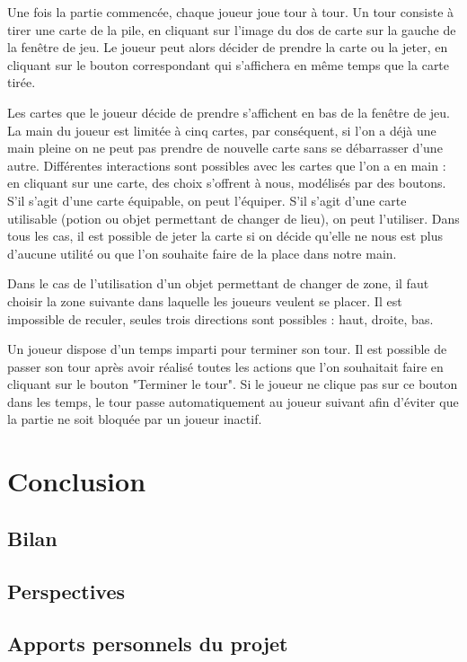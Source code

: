 \documentclass[12pt]{report}
\begin{document}
    Une fois la partie commencée, chaque joueur joue tour à tour. Un tour consiste à tirer une carte de la pile, en cliquant sur l'image du dos de carte sur la gauche de la fenêtre de jeu. Le joueur peut alors décider de prendre la carte ou la jeter, en cliquant sur le bouton correspondant qui s'affichera en même temps que la carte tirée.

    Les cartes que le joueur décide de prendre s'affichent en bas de la fenêtre de jeu. La main du joueur est limitée à cinq cartes, par conséquent, si l'on a déjà une main pleine on ne peut pas prendre de nouvelle carte sans se débarrasser d'une autre. Différentes interactions sont possibles avec les cartes que l'on a en main : en cliquant sur une carte, des choix s'offrent à nous, modélisés par des boutons. S'il s'agit d'une carte équipable, on peut l'équiper. S'il s'agit d'une carte utilisable (potion ou objet permettant de changer de lieu), on peut l'utiliser. Dans tous les cas, il est possible de jeter la carte si on décide qu'elle ne nous est plus d'aucune utilité ou que l'on souhaite faire de la place dans notre main.

    Dans le cas de l'utilisation d'un objet permettant de changer de zone, il faut choisir la zone suivante dans laquelle les joueurs veulent se placer. Il est impossible de reculer, seules trois directions sont possibles : haut, droite, bas.

    Un joueur dispose d'un temps imparti pour terminer son tour. Il est possible de passer son tour après avoir réalisé toutes les actions que l'on souhaitait faire en cliquant sur le bouton "Terminer le tour". Si le joueur ne clique pas sur ce bouton dans les temps, le tour passe automatiquement au joueur suivant afin d'éviter que la partie ne soit bloquée par un joueur inactif.

\chapter*{Conclusion}

    \section*{Bilan}

    \section*{Perspectives}

    \section*{Apports personnels du projet}
\end{document}
